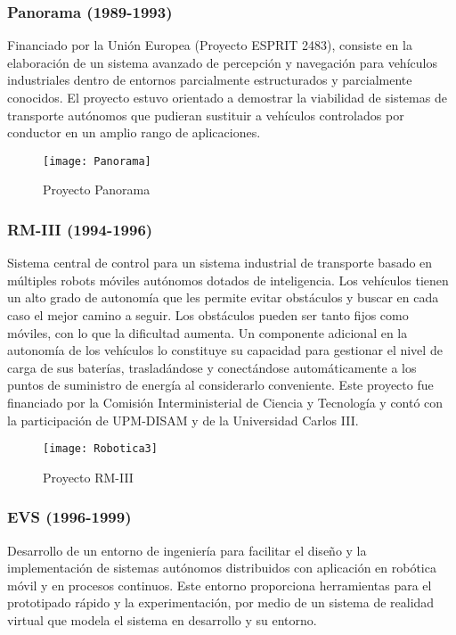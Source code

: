 \subsubsection{Panorama (1989-1993)}
Financiado por la Unión Europea (Proyecto ESPRIT 2483), consiste en la elaboración de un sistema avanzado de percepción y navegación para vehículos industriales dentro de entornos parcialmente estructurados y parcialmente conocidos. El proyecto estuvo orientado a demostrar la viabilidad de sistemas de transporte autónomos que pudieran sustituir a vehículos controlados por conductor en un amplio rango de aplicaciones.

\begin{figure}[hbt]
  \centering\texttt{[image: Panorama]}\\
  \caption{Proyecto Panorama}\label{fg:panorama}
\end{figure}


\subsubsection{RM-III (1994-1996)}
Sistema central de control para un sistema industrial de transporte basado en múltiples robots móviles autónomos dotados de inteligencia. Los vehículos tienen un alto grado de autonomía que les permite evitar obstáculos y buscar en cada caso el mejor camino a seguir. Los obstáculos pueden ser tanto fijos como móviles, con lo que la dificultad aumenta. Un componente adicional en la autonomía de los vehículos lo constituye su capacidad para gestionar el nivel de carga de sus baterías, trasladándose y conectándose automáticamente a los puntos de suministro de energía al considerarlo conveniente. Este proyecto fue financiado por la Comisión Interministerial de Ciencia y Tecnología y contó con la participación de UPM-DISAM y de la Universidad Carlos III.

\begin{figure}[hbt]
  \centering\texttt{[image: Robotica3]}\\
  \caption{Proyecto RM-III}\label{fg:RM-III}
\end{figure}


\subsubsection{EVS (1996-1999)}
Desarrollo de un entorno de ingeniería para facilitar el diseño y la implementación de sistemas autónomos distribuidos con aplicación en robótica móvil y en procesos continuos. Este entorno proporciona herramientas para el prototipado rápido y la experimentación, por medio de un sistema de realidad virtual que modela el sistema en desarrollo y su entorno.

